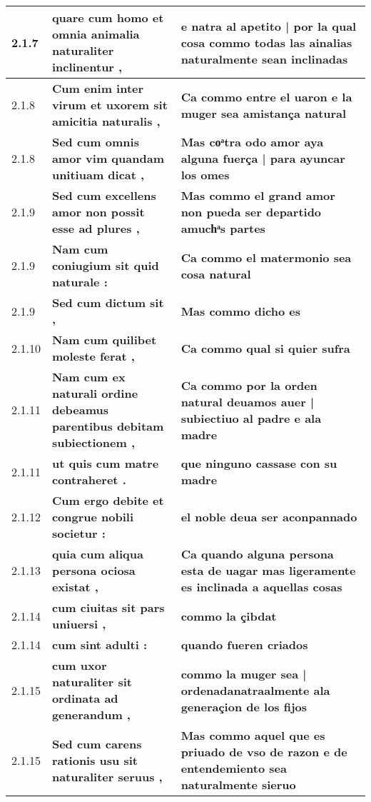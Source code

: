 \begin{tabular}{|p{1cm}|p{6.5cm}|p{6.5cm}|}
2.1.7 &  \textbf{ quare cum homo et omnia animalia naturaliter inclinentur , }  &  \textbf{ e natra al apetito | por la qual cosa commo todas las ainalias naturalmente sean inclinadas }  \\\hline
2.1.8 &  \textbf{ Cum enim inter virum et uxorem sit amicitia naturalis , }  &  \textbf{ Ca commo entre el uaron e la muger sea amistança natural }  \\\hline
2.1.8 &  \textbf{ Sed cum omnis amor vim quandam unitiuam dicat , }  &  \textbf{ Mas coͣtra odo amor aya alguna fuerça | para ayuncar los omes }  \\\hline
2.1.9 &  \textbf{ Sed cum excellens amor non possit esse ad plures , }  &  \textbf{ Mas commo el grand amor non pueda ser departido amuchͣs partes }  \\\hline
2.1.9 &  \textbf{ Nam cum coniugium sit quid naturale : }  &  \textbf{ Ca commo el matermonio sea cosa natural }  \\\hline
2.1.9 &  \textbf{ Sed cum dictum sit , }  &  \textbf{ Mas commo dicho es }  \\\hline
2.1.10 &  \textbf{ Nam cum quilibet moleste ferat , }  &  \textbf{ Ca commo qual si quier sufra }  \\\hline
2.1.11 &  \textbf{ Nam cum ex naturali ordine debeamus parentibus debitam subiectionem , }  &  \textbf{ Ca commo por la orden natural deuamos auer | subiectiuo al padre e ala madre }  \\\hline
2.1.11 &  \textbf{ ut quis cum matre contraheret . }  &  \textbf{ que ninguno cassase con su madre }  \\\hline
2.1.12 &  \textbf{ Cum ergo debite et congrue nobili societur : }  &  \textbf{ el noble deua ser aconpannado }  \\\hline
2.1.13 &  \textbf{ quia cum aliqua persona ociosa existat , }  &  \textbf{ Ca quando alguna persona esta de uagar mas ligeramente es inclinada a aquellas cosas }  \\\hline
2.1.14 &  \textbf{ cum ciuitas sit pars uniuersi , }  &  \textbf{ commo la çibdat }  \\\hline
2.1.14 &  \textbf{ cum sint adulti : }  &  \textbf{ quando fueren criados }  \\\hline
2.1.15 &  \textbf{ cum uxor naturaliter sit ordinata ad generandum , }  &  \textbf{ commo la muger sea | ordenadanatraalmente ala generaçion de los fijos }  \\\hline
2.1.15 &  \textbf{ Sed cum carens rationis usu sit naturaliter seruus , }  &  \textbf{ Mas commo aquel que es priuado de vso de razon e de entendemiento sea naturalmente sieruo }  \\\hline

\end{tabular}
